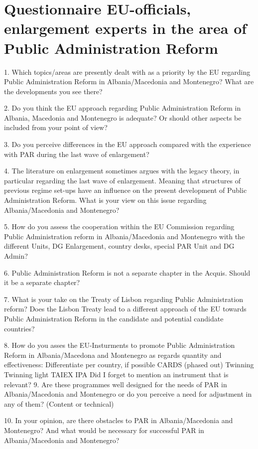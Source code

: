\pagestyle{empty}
\chapter{Questionnaire EU-officials, enlargement experts in the area of Public Administration Reform }
1. Which topics/areas are presently dealt with as a priority by the EU regarding Public Administration Reform in Albania/Macedonia and Montenegro? What are the developments you see there?

2. Do you think the EU approach regarding Public Administration Reform in Albania, Macedonia and Montenegro is adequate? Or should other aspects be included from your point of view?

3. Do you perceive differences in the EU approach compared with the experience with PAR during the last wave of enlargement?

4. The literature on enlargement sometimes argues with the legacy theory, in particular regarding the last wave of enlargement. Meaning that structures of previous regime set-ups have an influence on the present development of Public Administration Reform. What is your view on this issue regarding Albania/Macedonia and Montenegro?

5. How do you assess the cooperation within the EU Commission regarding Public Administration reform in Albania/Macedonia and Montenegro with the different Units, DG Enlargement, country desks, special PAR Unit and DG Admin? 

6. Public Administration Reform is not a separate chapter in the Acquis. Should it be a separate chapter? 

7. What is your take on the Treaty of Lisbon regarding Public Administration reform? Does the Lisbon Treaty lead to a different approach of the EU towards Public Administration Reform in the candidate and potential candidate countries? 

8. How do you asses the EU-Insturments to promote Public Administration Reform in Albania/Macedona and Montenegro as regards quantity and effectiveness:
Differentiate per country, if possible
CARDS (phased out)
Twinning
Twinning light
TAIEX
IPA
Did I forget to mention an instrument that is relevant?
9. Are these programmes well designed for the needs of PAR in Albania/Macedonia and Montenegro or do you perceive a need for adjustment in any of them? (Content or technical)


10. In your opinion, are there obstacles to PAR in Albania/Macedonia and Montenegro? And what would be necessary for successful PAR in Albania/Macedonia and Montenegro? 

